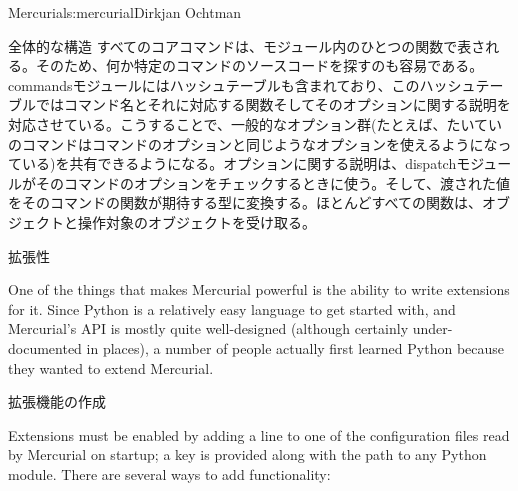 \begin{aosachapter}{Mercurial}{s:mercurial}{Dirkjan Ochtman}
\begin{aosasect1}{全体的な構造}
すべてのコアコマンドは、モジュール内のひとつの関数で表される。そのため、何か特定のコマンドのソースコードを探すのも容易である。commandsモジュールにはハッシュテーブルも含まれており、このハッシュテーブルではコマンド名とそれに対応する関数そしてそのオプションに関する説明を対応させている。こうすることで、一般的なオプション群(たとえば、たいていのコマンドはコマンドのオプションと同じようなオプションを使えるようになっている)を共有できるようになる。オプションに関する説明は、dispatchモジュールがそのコマンドのオプションをチェックするときに使う。そして、渡された値をそのコマンドの関数が期待する型に変換する。ほとんどすべての関数は、オブジェクトと操作対象のオブジェクトを受け取る。

\end{aosasect1}

\begin{aosasect1}{拡張性}

One of the things that makes Mercurial powerful is the ability to
write extensions for it. Since Python is a relatively easy language to
get started with, and Mercurial's API is mostly quite well-designed
(although certainly under-documented in places), a number of people
actually first learned Python because they wanted to extend Mercurial.

\begin{aosasect2}{拡張機能の作成}

Extensions must be enabled by adding a line to one of the
configuration files read by Mercurial on startup; a key is provided
along with the path to any Python module. There are several ways to
add functionality:


\end{aosasect2}
\end{aosasect1}
\end{aosachapter}
